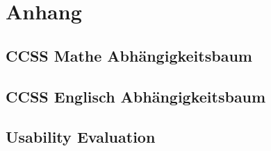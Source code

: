 \chapter*{Anhang}
\section*{CCSS Mathe Abhängigkeitsbaum}
	\label{CCSSMath}
	\begin{center}
		
	\end{center}

\section*{CCSS Englisch Abhängigkeitsbaum}
	\label{CCSSEnglish}
	\begin{center}
		
	\end{center}
	
\section*{Usability Evaluation}
	\label{UEMarcel}
	\begin{center}
		
	\end{center}
